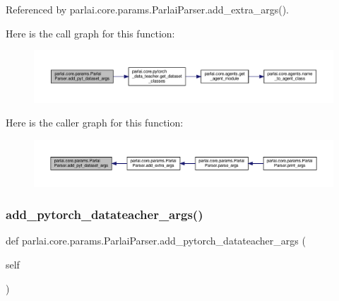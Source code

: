 Referenced by parlai.\+core.\+params.\+Parlai\+Parser.\+add\+\_\+extra\+\_\+args().

Here is the call graph for this function\+:
\nopagebreak
\begin{figure}[H]
\begin{center}
\leavevmode
\includegraphics[width=350pt]{classparlai_1_1core_1_1params_1_1ParlaiParser_a7d85a5e2fac2c1e8f0f75a4255850b9b_cgraph}
\end{center}
\end{figure}
Here is the caller graph for this function\+:
\nopagebreak
\begin{figure}[H]
\begin{center}
\leavevmode
\includegraphics[width=350pt]{classparlai_1_1core_1_1params_1_1ParlaiParser_a7d85a5e2fac2c1e8f0f75a4255850b9b_icgraph}
\end{center}
\end{figure}
\mbox{\label{classparlai_1_1core_1_1params_1_1ParlaiParser_a037989eca768126b981270b2bdf06b0c}} 
\subsubsection{\texorpdfstring{add\+\_\+pytorch\+\_\+datateacher\+\_\+args()}{add\_pytorch\_datateacher\_args()}}
{\footnotesize\ttfamily def parlai.\+core.\+params.\+Parlai\+Parser.\+add\+\_\+pytorch\+\_\+datateacher\+\_\+args (\begin{DoxyParamCaption}\item[{}]{self }\end{DoxyParamCaption})}

